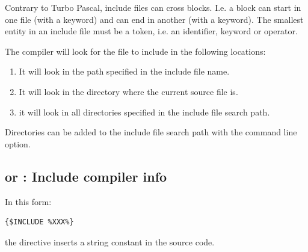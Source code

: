 Contrary to Turbo Pascal, include files can cross blocks. I.e. 
a block can start in one file (with a  keyword) and can end in another (with
a  keyword). The smallest entity in an include file must be a token,
i.e. an identifier, keyword or operator.

The compiler will look for the file to include in the following locations:

\begin{enumerate}
\item It will look in the path specified in the include file name.
\item It will look in the directory where the current source file is.
\item it will look in all directories specified in the include file search
path.
\end{enumerate}
Directories can be added to the include file search path with the 
command line option.

\subsection{ or  : Include compiler info}
In this form:
\begin{verbatim}
{$INCLUDE %XXX%}
\end{verbatim}
the  directive inserts a string constant in the source
code. 

